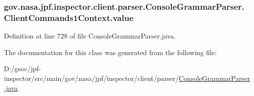 \subsubsection[{\texorpdfstring{value}{value}}]{ gov.\+nasa.\+jpf.\+inspector.\+client.\+parser.\+Console\+Grammar\+Parser.\+Client\+Commands1\+Context.\+value}\hypertarget{classgov_1_1nasa_1_1jpf_1_1inspector_1_1client_1_1parser_1_1_console_grammar_parser_1_1_client_commands1_context_a89e709d52f38f72c836e266ef0b699b3}{}\label{classgov_1_1nasa_1_1jpf_1_1inspector_1_1client_1_1parser_1_1_console_grammar_parser_1_1_client_commands1_context_a89e709d52f38f72c836e266ef0b699b3}


Definition at line 728 of file Console\+Grammar\+Parser.\+java.



The documentation for this class was generated from the following file\+:\begin{DoxyCompactItemize}
\item 
D\+:/gsoc/jpf-\/inspector/src/main/gov/nasa/jpf/inspector/client/parser/\hyperlink{_console_grammar_parser_8java}{Console\+Grammar\+Parser.\+java}\end{DoxyCompactItemize}
